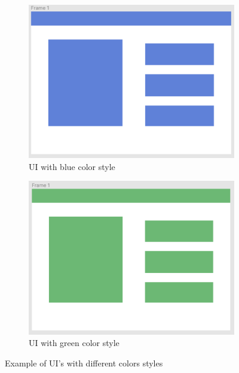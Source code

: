 \begin{figure}[H]
  \centering
  \begin{subfigure}[b]{0.48\textwidth}
    \centering
    \includegraphics[width=\linewidth]{images/layoutBlue.png}
    \caption{UI with blue color style}
    \label{fig:images/layoutBlue}
  \end{subfigure}
  \hfill
  \begin{subfigure}[b]{0.48\textwidth}
    \centering
    \includegraphics[width=\linewidth]{images/layoutGreen.png}
    \caption{UI with green color style}
    \label{fig:images/layoutGreen}
  \end{subfigure}
  \caption{Example of UI's with different colors styles}
  \label{fig:UIsWithDifferentColors}
\end{figure}

